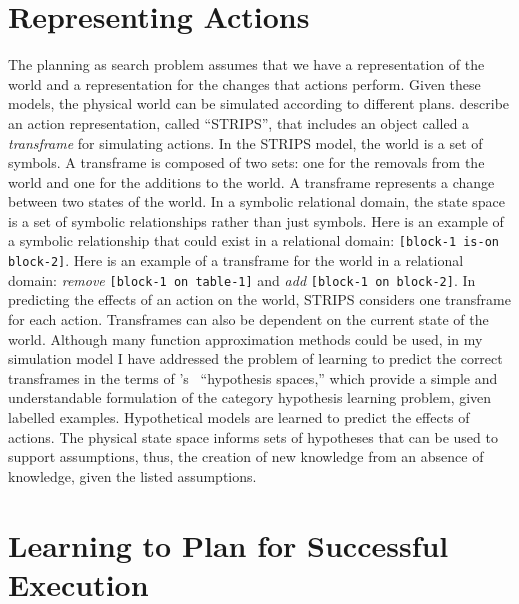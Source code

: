 \section{Representing Actions}

The planning as search problem assumes that we have a representation
of the world and a representation for the changes that actions
perform.  Given these models, the physical world can be simulated
according to different plans.  \cite{fikes:1972} describe an action
representation, called ``STRIPS'', that includes an object called a
\emph{transframe} for simulating actions.  In the STRIPS model, the
world is a set of symbols.  A transframe is composed of two sets: one
for the removals from the world and one for the additions to the
world.  A transframe represents a change between two states of the
world.  In a symbolic relational domain, the state space is a set of
symbolic relationships rather than just symbols.  Here is an example
of a symbolic relationship that could exist in a relational domain:
{\tt [block-1 is-on block-2]}.  Here is an example of a transframe for
the world in a relational domain: \emph{remove} {\tt [block-1 on
    table-1]} and \emph{add} {\tt [block-1 on block-2]}.  In
predicting the effects of an action on the world, STRIPS considers one
transframe for each action.  Transframes can also be dependent on the
current state of the world.  Although many function approximation
methods could be used, in my simulation model I have addressed the
problem of learning to predict the correct transframes in the terms of
{\mbox{\citeauthor{mitchell:1997}'s~\citeyearpar{mitchell:1997}}}
``hypothesis spaces,'' which provide a simple and understandable
formulation of the category hypothesis learning problem, given
labelled examples.  Hypothetical models are learned to predict the
effects of actions.  The physical state space informs sets of
hypotheses that can be used to support assumptions, thus, the creation
of new knowledge from an absence of knowledge, given the listed
assumptions.

\section{Learning to Plan for Successful Execution}

